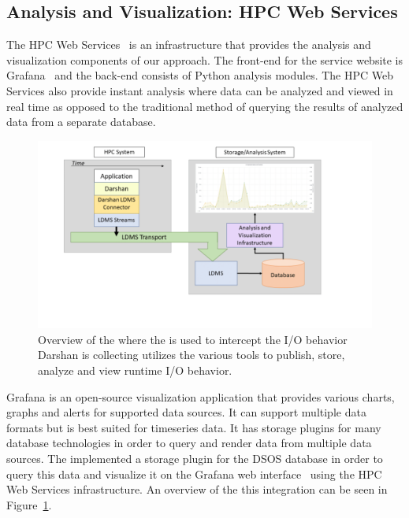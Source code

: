 \subsection{Analysis and Visualization: HPC Web Services}
The HPC Web Services~\cite{ClusterAV} is an infrastructure that provides the 
analysis and visualization components of our approach. 
The front-end for the service website is Grafana~\cite{grafana-website} and the 
back-end consists of Python analysis modules. The HPC Web Services also provide 
instant analysis where data can be analyzed and viewed in real time as opposed 
to the traditional method of querying the results of analyzed data from a separate database.

\begin{figure}
	\centering
	\includegraphics[trim=3cm 2cm 0cm 0cm, clip,width=1.2\linewidth]{figs/darshan-integration.png}
	\caption{Overview of the \Darshan{} where the \connector{} is used to intercept the I/O behavior Darshan is collecting utilizes the various tools to publish, store, analyze and view runtime I/O behavior.}
	\label{f:FrameworkOverview}
\end{figure}

Grafana is an open-source visualization application that provides various charts, 
graphs and alerts for supported data sources. It can support multiple data formats 
but is best suited for timeseries data. It has storage plugins for many database 
technologies in order to query and render data from multiple data sources. The 
\Darshan{} implemented a storage plugin for the DSOS database in order to query this 
data and visualize it on the Grafana web interface~\cite{grafana-website}
using the HPC Web Services infrastructure. An overview of the this integration 
can be seen in Figure~\ref{f:FrameworkOverview}.

